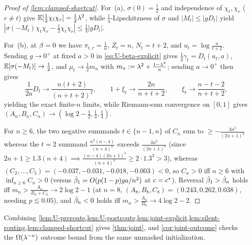 \begin{proof}[Proof of \cref{lem:clamped-shortcut}]
For~(a), $\sigma(0) = \frac{1}{2}$ and independence of $\chi_t, \chi_r$ ($r \ne t$) give $\mathbb E[\frac{1}{2}\chi_t\chi_r] = \frac{1}{2}\lambda^2$, while $\frac{1}{4}$-Lipschitzness of $\sigma$ and $|M_t| \le |g D_t|$ yield $|\sigma(-M_t)\chi_t\chi_r - \frac{1}{2}\chi_t\chi_r| \le \frac{1}{4}|g D_t|$.

For~(b), at $\beta = 0$ we have $\pi_{t,r} = \frac{1}{n}$, $Z_t = n$, $N_t = t+2$, and $u_t = \log\frac{n}{t+2}$. Sending $g \to 0^+$ at fixed $a > 0$ in \cref{eq:U-beta-explicit} gives $\frac{1}{g}\gamma_t = D_t(u_t, a)$, $\mathbb E[\sigma(-M_t)] \to \frac{1}{2}$, and $\mu_t \to \frac{1}{2}m_n$ with $m_n := \lambda^2 + \frac{1-\lambda^2}{n}$; sending $a \to 0^+$ then gives
\[
  \frac{1}{2a}D_t \to \frac{n(t+2)}{(n+t+2)^2}, \qquad
  1 + \xi_t \to \frac{2n}{n+t+2}, \qquad
  \xi_t \to \frac{n-t-2}{n+t+2},
\]
yielding the exact finite-$n$ limits, while Riemann-sum convergence on $[0,1]$ gives $(A_n, B_n, C_n) \to (\log 2 - \frac{1}{2}, \frac{1}{4}, \frac{1}{4})$.

For $n \ge 6$, the two negative summands $t \in \{n-1, n\}$ of $C_n$ sum to $\ge -\frac{3n^2}{(2n+1)^3}$ whereas the $t = 2$ summand $\frac{n^2(n-4)}{(n+4)^3}$ exceeds $\frac{3n^2}{(2n+1)^3}$ (since $2n+1 \ge 1.3(n+4) \implies \frac{(n-4)(2n+1)^3}{(n+4)^3} \ge 2\cdot 1.3^3 > 3$), whereas $(C_2,\ldots,C_5) = (-0.037, -0.031, -0.018, -0.003) < 0$, so $C_n > 0$ iff $n \ge 6$ with $\inf_{n\ge 6} C_n > 0$ (versus $\dot{\beta}_1 = O(p(1-p)ga/n^2)$ at $c = c^\star$). Reversal $\dot{\beta}_1 > \dot{\beta}_n$ holds iff $m_n > \frac{A_n}{B_n + C_n} \to 2\log 2 - 1$ (at $n = 8$, $(A_8, B_8, C_8) = (0.243, 0.262, 0.038)$, needing $p \lesssim 0.05$), and $\dot{\beta}_n < 0$ holds iff $m_n > \frac{A_n}{B_n} \to 4\log 2 - 2$.
\end{proof}

Combining \cref{lem:U-preroute,lem:U-postroute,lem:joint-explicit,lem:silent-routing,lem:clamped-shortcut} gives \cref{thm:joint}, and \cref{cor:joint-outcome} checks the $\Omega(\lambda^{-n})$ outcome bound from the same unmasked initialization.

